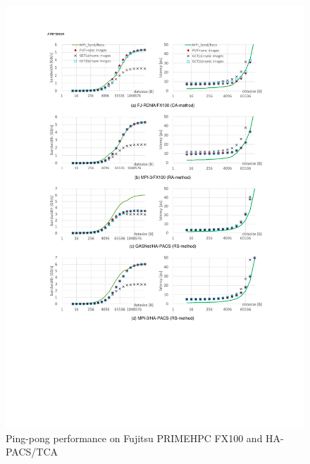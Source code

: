 
\begin{figure}[p]
  \begin{center}
    \mbox{\includegraphics[trim=30mm 70mm 30mm 23mm, scale=0.78, clip]{graphs/8graphs-8.pdf}}
    \caption{Ping-pong performance on Fujitsu PRIMEHPC FX100 and HA-PACS/TCA}\label{fig:8graphs}
  \end{center}
\end{figure}

